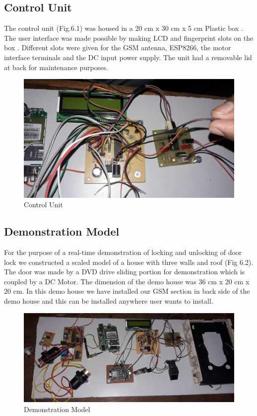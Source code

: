 \documentclass[twoside,a4paper,16pt]{book}
\begin{document}
{{\subsection{Control Unit }
The control unit (Fig.6.1)  was housed in a 20 cm x 30 cm x 5 cm Plastic box . The user interface was made possible by making LCD and fingerprint slots on the box . Different slots were given for the GSM antenna, ESP8266, the motor interface terminals and the DC input power supply. The unit had a removable lid at back for maintenance purposes.
\begin{figure}[ht!]
	\begin{center}
		\includegraphics[width=14.0cm]{cont.jpg}
		\caption{Control Unit }
	\end{center}
\end{figure}
\subsection{Demonstration Model}
For the purpose of a real-time demonstration of locking and unlocking of door lock we constructed a scaled model of a house with three walls and roof (Fig 6.2). The door was made by a DVD drive sliding portion for demonstration which is coupled by a DC Motor. The dimension of the demo house was 36 cm x 20 cm x 20 cm.      In this   demo house we have installed our GSM section in back side of the demo house and this can be installed anywhere user wants to install.\\
\begin{figure}[ht!]
	\begin{center}
		\includegraphics[width=15.0cm]{cont1.jpg}
		\caption{Demonstration Model }
	\end{center}
\end{figure}
}}
\end{document}
